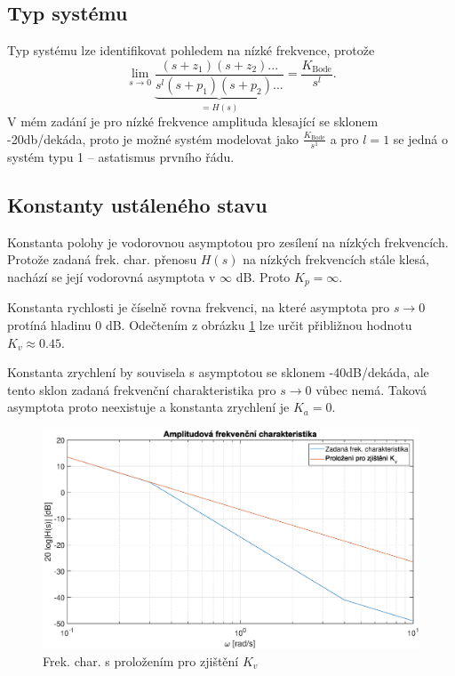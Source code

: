 \documentclass[twoside]{article}
\begin{document}
\subsection{Typ systému}
Typ systému lze identifikovat pohledem na nízké frekvence, protože
\begin{equation}
	\lim_{s \to 0} \underbrace{\frac{(s+z_1)(s+z_2)...}{s^l(s+p_1)(s+p_2)...}}_{=H(s)} = \frac{K_{\text{Bode}}}{s^l}.
\end{equation}
V mém zadání je pro nízké frekvence amplituda klesající se sklonem -20db/dekáda, proto je možné systém modelovat 
jako $\frac{K_{\text{Bode}}}{s^1}$ a pro $l = 1$ se jedná o systém typu 1 -- astatismus prvního řádu.

\subsection{Konstanty ustáleného stavu}
Konstanta polohy je vodorovnou asymptotou pro zesílení na nízkých frekvencích. Protože zadaná frek. char. přenosu $H(s)$
na nízkých frekvencích stále klesá, nachází se její vodorovná asymptota v $\infty$ dB. Proto $K_p = \infty$.

Konstanta rychlosti je číselně rovna frekvenci, na které asymptota pro $s \to 0$ protíná hladinu 0 dB.
Odečtením z obrázku \ref{fig:prolozeni_rychlost} lze určit přibližnou hodnotu $K_v \approx 0.45$.

Konstanta zrychlení by souvisela s asymptotou se sklonem -40dB/dekáda, ale tento sklon zadaná frekvenční charakteristika
pro $s \to 0$ vůbec nemá. Taková asymptota proto neexistuje a konstanta zrychlení je $K_a = 0$.
\begin{figure}[htbp]
	\centering
	\includegraphics[width=\linewidth]{prolozeni_rychlost.eps}
	\caption{Frek. char. s proložením pro zjištění $K_v$}
	\label{fig:prolozeni_rychlost}
\end{figure}
\end{document}
